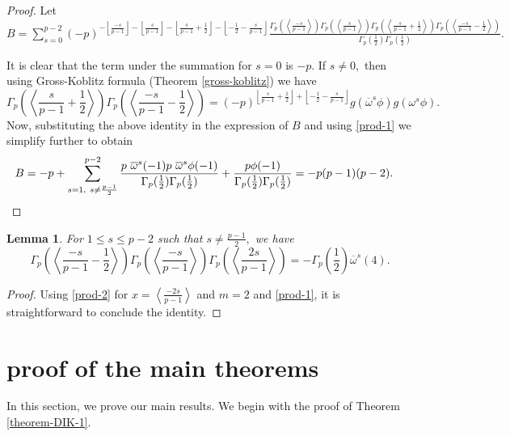 \documentclass[12pt]{amsart}
\theoremstyle{plain}
\newtheorem{lemma}[theorem]{Lemma}
\theoremstyle{definition}
\theoremstyle{remark}
\numberwithin{equation}{section}
\begin{document}
\begin{proof}
Let $B=\sum\limits_{s=0}^{p-2}(-p)^{-\left\lfloor\frac{-s}{p-1}\right\rfloor-\left\lfloor\frac{s}{p-1}\right\rfloor-\left\lfloor\frac{s}{p-1}+\frac{1}{2}\right\rfloor-\left\lfloor-\frac{1}{2}-\frac{s}{p-1}\right\rfloor}\frac{\Gamma_p\left(\left\langle\frac{-s}{p-1}\right\rangle\right)\Gamma_p\left(\left\langle\frac{s}{p-1}\right\rangle\right)\Gamma_p\left(\left\langle\frac{s}{p-1}+\frac{1}{2}\right\rangle\right)\Gamma_p\left(\left\langle\frac{-s}{p-1}-\frac{1}{2}\right\rangle\right)}{\Gamma_p\left(\frac{1}{2}\right) \Gamma_p\left(\frac{1}{2}\right)}.$

It is clear that the term under the summation for $s=0$ is $-p.$ If $s\neq0,$ then using Gross-Koblitz formula (Theorem \ref{gross-koblitz}) we have 
$$\Gamma_p\left(\left\langle\frac{s}{p-1}+\frac{1}{2}\right\rangle\right)\Gamma_p\left(\left\langle\frac{-s}{p-1}-\frac{1}{2}\right\rangle\right)=(-p)^{\left\lfloor\frac{s}{p-1}+\frac{1}{2}\right\rfloor+\left\lfloor-\frac{1}{2}-\frac{s}{p-1}\right\rfloor}
g(\overline{\omega}^s\phi)g({\omega}^{s}\phi).$$
Now, substituting the above identity in the expression of $B$ and using \eqref{prod-1} we simplify further to obtain 
\begin{align}
B&=-p+\sum_{s=1,\ s\neq \frac{p-1}{2}}^{p-2} \frac{p\ \overline{\omega}^s(-1)p\ {\overline{\omega}^s\phi}(-1)}{\Gamma_p(\frac{1}{2})\Gamma_p(\frac{1}{2})}+\frac{p\phi(-1)}{\Gamma_p(\frac{1}{2})\Gamma_p(\frac{1}{2})}
=-p(p-1)(p-2).\notag
\end{align}
\end{proof}
\begin{lemma}\label{lemma-100}
For $1\leq s\leq p-2$ such that $s\neq \frac{p-1}{2},$ we have 
$$\Gamma_p\left(\left\langle\frac{-s}{p-1}-\frac{1}{2}\right\rangle\right)\Gamma_p\left(\left\langle\frac{-s}{p-1}\right\rangle\right) \Gamma_p\left(\left\langle\frac{2s}{p-1}\right\rangle\right)=-{\Gamma_p\left(\frac{1}{2}\right)}\overline{\omega}^s(4).$$
\end{lemma}
\begin{proof}
Using \eqref{prod-2} for $x=\left\langle\frac{-2s}{p-1}\right\rangle$ and $m=2$ and \eqref{prod-1}, it is straightforward to conclude the identity.
\end{proof}

\section{proof of the main theorems}
In this section, we prove our main results. We begin with the proof of Theorem \ref{theorem-DIK-1}.
\end{document}
